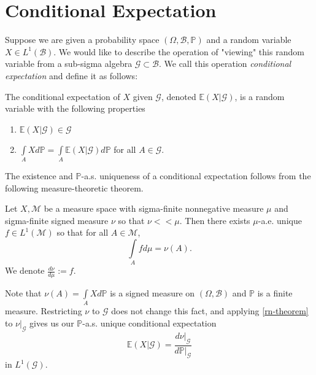 \section{Conditional Expectation}
\label{stoch:cexpe}

Suppose we are given a probability space \((\Omega, \mathcal{B}, \mathbb{P})\) and a random variable \(X \in L^{1}(\mathcal{B})\). We would like to describe the operation of "viewing" this random variable from a sub-sigma algebra \(\mathcal{G} \subset \mathcal{B}\). We call this operation \textit{conditional expectation} and define it as follows:

\begin{definition}
   The conditional expectation of \(X\) given \(\mathcal{G}\), denoted \(\mathbb{E}({X}|{\mathcal{G}})\), is a random variable with the following properties
    \begin{enumerate}
        \item \(\mathbb{E}({X}|{\mathcal{G}}) \in \mathcal{G}\)
        \item \(\int\limits_{A} X d \mathbb{P} = \int\limits_{A} \mathbb{E}({X}|{\mathcal{G}}) d \mathbb{P}\) for all \(A \in \mathcal{G}\).
    \end{enumerate}
\end{definition}

The existence and \(\mathbb{P}\)-a.s. uniqueness of a conditional expectation follows from the following measure-theoretic theorem.

\begin{theorem}
    \label{rn-theorem}
    Let \(X, \mathcal{M}\) be a measure space with sigma-finite nonnegative measure \(\mu\) and sigma-finite signed measure \(\nu\) so that \(\nu << \mu\). Then there exists \(\mu\)-a.e. unique \(f \in L^{1}(\mathcal{M})\) so that for all \(A \in \mathcal{M}\),
    \[\int\limits_{A}f d \mu = \nu(A).\]
    We denote \(\frac{d \nu}{d \mu} := f\).
\end{theorem}

Note that \(\nu(A) = \int\limits_{A} X d \mathbb{P}\) is a signed measure on \((\Omega, \mathcal{B})\) and \(\mathbb{P}\) is a finite measure. Restricting \(\nu\) to \(\mathcal{G}\) does not change this fact, and applying \ref{rn-theorem} to \(\nu{\big|}_{\mathcal{G}}\) gives us our \(\mathbb{P}\)-a.s. unique conditional expectation
\[\mathbb{E}({X}|{\mathcal{G}}) = \frac{d \nu{\big|}_{\mathcal{G}}}{d \mathbb{P}{\big|}_{\mathcal{G}}} \]
in \(L^{1}(\mathcal{G})\).

